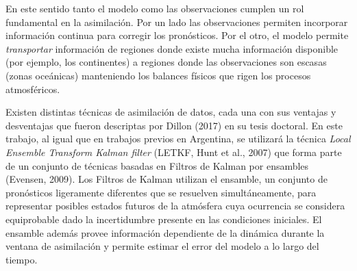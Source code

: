 \documentclass[12pt,oneside,a4paper]{reedthesis}
\begin{document}
En este sentido tanto el modelo como las observaciones cumplen un rol fundamental en la asimilación. Por un lado las observaciones permiten incorporar información continua para corregir los pronósticos. Por el otro, el modelo permite \emph{transportar} información de regiones donde existe mucha información disponible (por ejemplo, los continentes) a regiones donde las observaciones son escasas (zonas oceánicas) manteniendo los balances físicos que rigen los procesos atmosféricos.

Existen distintas técnicas de asimilación de datos, cada una con sus ventajas y desventajas que fueron descriptas por Dillon (2017) en su tesis doctoral. En este trabajo, al igual que en trabajos previos en Argentina, se utilizará la técnica \emph{Local Ensemble Transform Kalman filter} (LETKF, Hunt et al., 2007) que forma parte de un conjunto de técnicas basadas en Filtros de Kalman por ensambles (Evensen, 2009). Los Filtros de Kalman utilizan el ensamble, un conjunto de pronósticos ligeramente diferentes que se resuelven simultáneamente, para representar posibles estados futuros de la atmósfera cuya ocurrencia se considera equiprobable dado la incertidumbre presente en las condiciones iniciales. El ensamble además provee información dependiente de la dinámica durante la ventana de asimilación y permite estimar el error del modelo a lo largo del tiempo.
\end{document}
